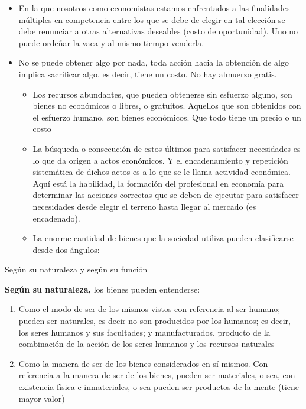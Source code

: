 \documentclass[
  letterpaper,
  DIV=11,
  numbers=noendperiod]{scrartcl}
\providecommand{\tightlist}{%
  \setlength{\itemsep}{0pt}\setlength{\parskip}{0pt}}\usepackage{longtable,booktabs,array}
\begin{document}
\begin{itemize}
\tightlist
\item
  En la que nosotros como economistas estamos enfrentados a las
  finalidades múltiples en competencia entre los que se debe de elegir
  en tal elección se debe renunciar a otras alternativas deseables
  (costo de oportunidad). Uno no puede ordeñar la vaca y al mismo tiempo
  venderla.
\item
  No se puede obtener algo por nada, toda acción hacia la obtención de
  algo implica sacrificar algo, es decir, tiene un costo. No hay
  almuerzo gratis.

  \begin{itemize}
  \tightlist
  \item
    Los recursos abundantes, que pueden obtenerse sin esfuerzo alguno,
    son bienes no económicos o libres, o gratuitos. Aquellos que son
    obtenidos con el esfuerzo humano, son bienes económicos. Que todo
    tiene un precio o un costo
  \item
    La búsqueda o consecución de estos últimos para satisfacer
    necesidades es lo que da origen a actos económicos. Y el
    encadenamiento y repetición sistemática de dichos actos es a lo que
    se le llama actividad económica. Aquí está la habilidad, la
    formación del profesional en economía para determinar las acciones
    correctas que se deben de ejecutar para satisfacer necesidades desde
    elegir el terreno hasta llegar al mercado (es encadenado).
  \item
    La enorme cantidad de bienes que la sociedad utiliza pueden
    clasificarse desde dos ángulos:
  \end{itemize}
\end{itemize}

Según su naturaleza y según su función

\textbf{Según su naturaleza,} los bienes pueden entenderse:

\begin{enumerate}
\def\labelenumi{\arabic{enumi}.}
\item
  Como el modo de ser de los mismos vistos con referencia al ser humano;
  pueden ser naturales, es decir no son producidos por los humanos; es
  decir, los seres humanos y sus facultades; y manufacturados, producto
  de la combinación de la acción de los seres humanos y los recursos
  naturales
\item
  Como la manera de ser de los bienes considerados en sí mismos. Con
  referencia a la manera de ser de los bienes, pueden ser materiales, o
  sea, con existencia física e inmateriales, o sea pueden ser productos
  de la mente (tiene mayor valor)
\end{enumerate}
\end{document}

